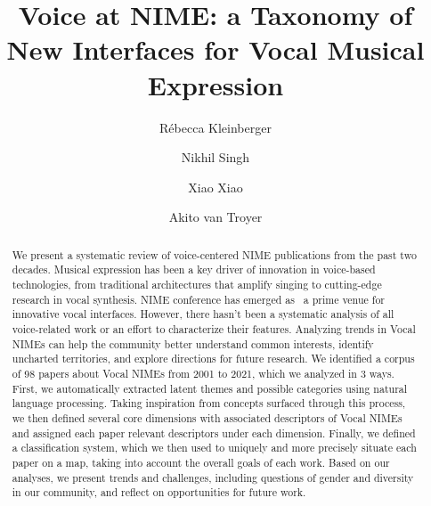 \documentclass[sigconf]{nimeart}
\begin{document}
\title[Voice at NIME: a Taxonomy of New Interfaces for Vocal Musical…]{Voice at NIME: a Taxonomy of New Interfaces for Vocal Musical Expression}
\author{Rébecca Kleinberger}
\author{Nikhil Singh}
\author{Xiao Xiao}
\author{Akito van Troyer}
\renewcommand{\shortauthors}{Kleinberger et al.}
\begin{abstract}
We present a systematic review of voice-centered NIME publications from the past two decades. Musical expression has been a key driver of innovation in voice-based technologies, from traditional architectures that amplify singing to cutting-edge research in vocal synthesis. NIME conference has emerged as~ a prime venue for innovative vocal interfaces. However, there hasn't been a systematic analysis of all voice-related work or an effort to characterize their features. Analyzing trends in Vocal NIMEs can help the community better understand common interests, identify uncharted territories, and explore directions for future research. We identified a corpus of 98 papers about Vocal NIMEs from 2001 to 2021, which we analyzed in 3 ways. First, we automatically extracted latent themes and possible categories using natural language processing. Taking inspiration from concepts surfaced through this process, we then defined several core dimensions with associated descriptors of Vocal NIMEs and assigned each paper relevant descriptors under each dimension. Finally, we defined a classification system, which we then used to uniquely and more precisely situate each paper on a map, taking into account the overall goals of each work. Based on our analyses, we present trends and challenges, including questions of gender and diversity in our community, and reflect on opportunities for future work.
\end{abstract}

\maketitle
\end{document}
